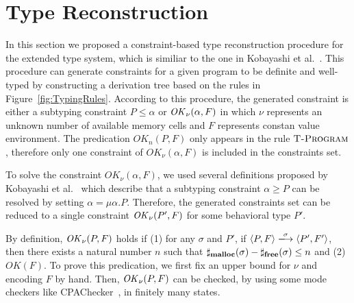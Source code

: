 \section{Type Reconstruction}
\label{sec:reconstruction}
In this section we proposed a constraint-based type reconstruction
procedure for the extended type system, which is similiar to the one
in Kobayashi et al.~\cite{DBLP:journals/lmcs/KobayashiSW06}.  This
procedure can generate constraints for a given program to be definite
and well-typed by constructing a derivation tree based on the rules in
Figure~\ref{fig:TypingRules}. According to this procedure, the
generated constraint is either a subtyping constraint \(P \le \alpha
\) or \(\mathit{OK}_\nu(\alpha, F)\) in which \(\nu\) represents an unknown
number of available memory cells and \(F\) represents constan value
environment. The predication \(OK_n(P, F)\) only appears in the rule
\(\textsc{T-Program}\), therefore only one constraint of
\(OK_\nu(\alpha, F)\) is included in the constraints set.

To solve the constraint \(OK_\nu(\alpha, F)\), we used several
definitions proposed by Kobayashi et al.~\cite[Lemma
  3.8]{DBLP:journals/lmcs/KobayashiSW06} which describe that a
subtyping constraint \(\alpha \ge P\) can be resolved by setting
\(\alpha = \mu \alpha. P\).  Therefore, the generated constraints set
can be reduced to a single constraint \(\mathit{OK}_{\nu}(P', F)\) for some
behavioral type \(P'\).

By definition, \(\mathit{OK}_{\nu}(P, F)\) holds if (1) for any \(\sigma\) and
\(P'\), if \(\langle P, F \rangle \xlongrightarrow{\sigma} \langle P',
F'\rangle \), then there exists a natural number \(n\) such that
\(\sharp_{\mathbf{malloc}}(\sigma) - \sharp_{\mathbf{free}}(\sigma) \le n\) and (2)
\(OK(F)\). To prove this predication, we first fix an upper bound for
\(\nu\) and encoding \(F\) by hand.  Then, \(\mathit{OK}_{\nu}(P, F)\) can be
checked, by using some mode checkers like
CPAChecker~\cite{beyer2011cpachecker}, in finitely many states.

